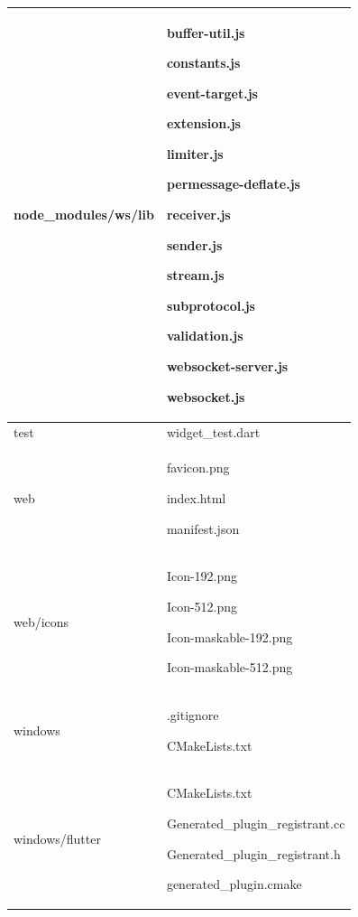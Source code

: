 \documentclass[conference]{IEEEtran}
\begin{document}
\begin{table}[h]
\begin{tabular}{|p{3.7cm}|p{4.1cm}|}
        node\_modules/ws/lib \par   & \par buffer-util.js \par constants.js \par event-target.js \par extension.js \par limiter.js \par permessage-deflate.js \par receiver.js \par sender.js \par stream.js \par subprotocol.js \par validation.js \par websocket-server.js \par websocket.js
        \\ \hline

        test   & \par widget\_test.dart
        \\ \hline

        web & \par favicon.png \par index.html \par manifest.json
        \\ \hline

        web/icons \par   & \par Icon-192.png \par Icon-512.png \par Icon-maskable-192.png \par Icon-maskable-512.png
        \\ \hline

        windows \par   & \par .gitignore \par CMakeLists.txt
        \\ \hline

        windows/flutter \par   & \par CMakeLists.txt \par Generated\_plugin\_registrant.cc \par Generated\_plugin\_registrant.h \par generated\_plugin.cmake
        \\ \hline


\end{tabular}
\end{table}
\end{document}
